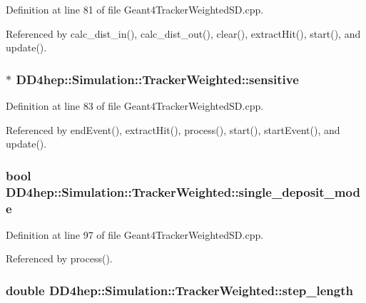 Definition at line 81 of file Geant4TrackerWeightedSD.cpp.

Referenced by calc\_\-dist\_\-in(), calc\_\-dist\_\-out(), clear(), extractHit(), start(), and update().\hypertarget{struct_d_d4hep_1_1_simulation_1_1_tracker_weighted_a6c247f2290b5f072a9be93c75dacf631}{
\subsubsection[{sensitive}]{$\ast$ {\bf DD4hep::Simulation::TrackerWeighted::sensitive}}}
\label{struct_d_d4hep_1_1_simulation_1_1_tracker_weighted_a6c247f2290b5f072a9be93c75dacf631}


Definition at line 83 of file Geant4TrackerWeightedSD.cpp.

Referenced by endEvent(), extractHit(), process(), start(), startEvent(), and update().\hypertarget{struct_d_d4hep_1_1_simulation_1_1_tracker_weighted_aca48801717dfd735529eb3fda99e999a}{
\subsubsection[{single\_\-deposit\_\-mode}]{\setlength{\rightskip}{0pt plus 5cm}bool {\bf DD4hep::Simulation::TrackerWeighted::single\_\-deposit\_\-mode}}}
\label{struct_d_d4hep_1_1_simulation_1_1_tracker_weighted_aca48801717dfd735529eb3fda99e999a}


Definition at line 97 of file Geant4TrackerWeightedSD.cpp.

Referenced by process().\hypertarget{struct_d_d4hep_1_1_simulation_1_1_tracker_weighted_a82fd5f47ec95d179a132145c54a78873}{
\subsubsection[{step\_\-length}]{\setlength{\rightskip}{0pt plus 5cm}double {\bf DD4hep::Simulation::TrackerWeighted::step\_\-length}}}
\label{struct_d_d4hep_1_1_simulation_1_1_tracker_weighted_a82fd5f47ec95d179a132145c54a78873}


